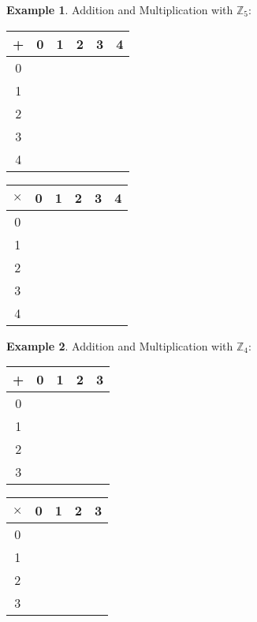 \documentclass[12pt]{amsart}
\theoremstyle{plain}
\theoremstyle{definition}
\newtheorem*{ex}{Example}
\theoremstyle{remark}
\newcommand{\bex}{\begin{ex}}
\newcommand{\eex}{\end{ex}}
\begin{document}
\newpage \bex
Addition and Multiplication with $\mathbb{Z}_5$:\\
\begin{center}
\begin{tabular}{c|p{.3in}p{.3in}p{.3in}p{.3in}p{.3in}}
+ & 0 & 1 & 2 & 3 & 4\\ \hline
0 & & & & &\vspace{.2in}\\ 
1 & & & & &\vspace{.2in}\\
2 & & & & &\vspace{.2in}\\
3 & & & & &\vspace{.2in}\\
4 & & & & &\vspace{.2in}\\
\end{tabular}
\begin{tabular}{c|p{.3in}p{.3in}p{.3in}p{.3in}p{.3in}}
$\times$ & 0 & 1 & 2 & 3 & 4\\ \hline
0 & & & & &\vspace{.2in}\\ 
1 & & & & &\vspace{.2in}\\
2 & & & & &\vspace{.2in}\\
3 & & & & &\vspace{.2in}\\
4 & & & & &\vspace{.2in}\\
\end{tabular}
\end{center}
\eex

\bex
Addition and Multiplication with $\mathbb{Z}_4$:\\
\begin{center}
\begin{tabular}{c|p{.3in}p{.3in}p{.3in}p{.3in}}
+ & 0 & 1 & 2 & 3 \\ \hline
0 & & & &\vspace{.2in}\\ 
1 & & & &\vspace{.2in}\\
2 & & & &\vspace{.2in}\\
3 & & & &\vspace{.2in}\\
\end{tabular}
\begin{tabular}{c|p{.3in}p{.3in}p{.3in}p{.3in}}
$\times$ & 0 & 1 & 2 & 3 \\ \hline
0 & & & &\vspace{.2in}\\ 
1 & & & &\vspace{.2in}\\
2 & & & &\vspace{.2in}\\
3 & & & &\vspace{.2in}\\
\end{tabular}
\end{center}
\eex
\end{document}

